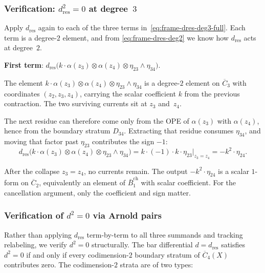 \subsubsection*{Verification: $d_{\mathrm{res}}^2 = 0$ at degree~$3$}

Apply $d_{\mathrm{res}}$ again to each of the three terms
in~\eqref{eq:frame-dres-deg3-full}.
Each term is a degree-$2$ element, and from
\eqref{eq:frame-dres-deg2} we know how $d_{\mathrm{res}}$ acts
at degree~$2$.

\medskip
\noindent\textbf{First term}: $d_{\mathrm{res}}\bigl(
k \cdot \alpha(z_3) \otimes \alpha(z_4)
\otimes \eta_{23} \wedge \eta_{34}\bigr)$.

The element $k \cdot \alpha(z_3) \otimes \alpha(z_4)
\otimes \eta_{23} \wedge \eta_{34}$ is a degree-$2$ element
on $\overline{C}_3$ with coordinates $(z_2, z_3, z_4)$,
carrying the scalar coefficient $k$ from the previous
contraction. The two surviving currents sit at $z_3$
and~$z_4$.

The next residue can therefore come only from the OPE of
$\alpha(z_3)$ with $\alpha(z_4)$, hence from the boundary stratum
$D_{34}$. Extracting that residue consumes $\eta_{34}$, and moving
that factor past $\eta_{23}$ contributes the sign $-1$:
\begin{equation}\label{eq:frame-dsq-T1}
d_{\mathrm{res}}\bigl(
 k \cdot \alpha(z_3) \otimes \alpha(z_4)
 \otimes \eta_{23} \wedge \eta_{34}\bigr)
= k \cdot (-1) \cdot k \cdot \eta_{23}\big|_{z_3 = z_4}
= -k^2 \cdot \eta_{24}.
\end{equation}

After the collapse $z_3 = z_4$, no currents remain.
The output $-k^2 \cdot \eta_{24}$ is a scalar $1$-form on
$\overline{C}_2$, equivalently an element of
$\bar{B}_1^{\mathrm{ch}}$ with scalar coefficient. For the
cancellation argument, only the coefficient and sign matter.

\subsubsection*{Verification of $d^2 = 0$ via Arnold pairs}

Rather than applying $d_{\mathrm{res}}$ term-by-term to all
three summands and tracking relabeling, we verify $d^2 = 0$
structurally. The bar differential
$d = d_{\mathrm{res}}$ satisfies $d^2 = 0$ if and only if
every codimension-$2$ boundary stratum of $\overline{C}_4(X)$
contributes zero. The codimension-$2$ strata are of two types:

